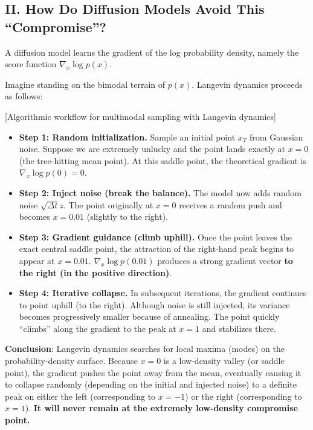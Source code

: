 \hypertarget{ii.-how-do-diffusion-models-avoid-this-compromise}{%
\subsection{II. How Do Diffusion Models Avoid This ``Compromise''?}\label{ii.-how-do-diffusion-models-avoid-this-compromise}}

A diffusion model learns the gradient of the log probability density, namely the score function \(\nabla_x\log p(x)\).

Imagine standing on the bimodal terrain of \(p(x)\). Langevin dynamics proceeds as follows:

{[}Algorithmic workflow for multimodal sampling with Langevin dynamics{]}

\begin{itemize}
\tightlist
\item
  \textbf{Step 1: Random initialization.} Sample an initial point \(x_T\) from Gaussian noise. Suppose we are extremely unlucky and the point lands exactly at \(x=0\) (the tree-hitting mean point). At this saddle point, the theoretical gradient is \(\nabla_x\log p(0)=0\).
\item
  \textbf{Step 2: Inject noise (break the balance).} The model now adds random noise \(\sqrt{\Delta t}z\). The point originally at \(x=0\) receives a random push and becomes \(x=0.01\) (slightly to the right).
\item
  \textbf{Step 3: Gradient guidance (climb uphill).} Once the point leaves the exact central saddle point, the attraction of the right-hand peak begins to appear at \(x=0.01\). \(\nabla_x\log p(0.01)\) produces a strong gradient vector \textbf{to the right (in the positive direction)}.
\item
  \textbf{Step 4: Iterative collapse.} In subsequent iterations, the gradient continues to point uphill (to the right). Although noise is still injected, its variance becomes progressively smaller because of annealing. The point quickly ``climbs'' along the gradient to the peak at \(x=1\) and stabilizes there.
\end{itemize}

\textbf{Conclusion}: Langevin dynamics searches for local maxima (modes) on the probability-density surface. Because \(x=0\) is a low-density valley (or saddle point), the gradient pushes the point away from the mean, eventually causing it to collapse randomly (depending on the initial and injected noise) to a definite peak on either the left (corresponding to \(x=-1\)) or the right (corresponding to \(x=1\)). \textbf{It will never remain at the extremely low-density compromise point.}

